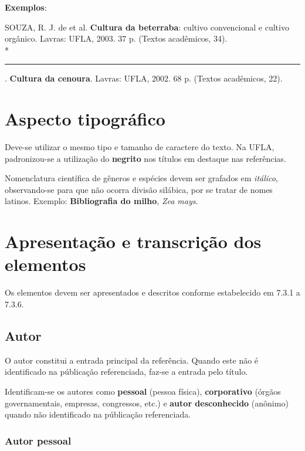 \begin{exemplomanual}
\textbf{Exemplos}:\\
\begin{singlespace}
SOUZA, R. J. de et al. \textbf{Cultura da beterraba}: cultivo convencional e cultivo orgânico. Lavras: UFLA, 2003. 37 p. (Textos acadêmicos, 34).\\*

\rule{1cm}{0.4pt}. \textbf{Cultura da cenoura}. Lavras: UFLA, 2002. 68 p. (Textos acadêmicos, 22).
\end{singlespace}
\end{exemplomanual}


\section{Aspecto tipográfico}

Deve-se utilizar o mesmo tipo e tamanho de caractere do texto. Na UFLA, padronizou-se a utilização do \textbf{negrito} nos títulos em destaque nas referências.

Nomenclatura científica de gêneros e espécies devem ser grafados em \textit{itálico}, observando-se para que não ocorra divisão silábica, por se tratar de nomes latinos.  Exemplo: \textbf{Bibliografia do milho}, \textit{Zea mays}.


\section{Apresentação e transcrição dos elementos}

Os elementos devem ser apresentados e descritos conforme estabelecido em 7.3.1 a 7.3.6.


\subsection{Autor}

O autor constitui a entrada principal da referência. Quando este não é identificado na públicação referenciada, faz-se a entrada pelo título.

Identificam-se os autores como \textbf{pessoal} (pessoa física), \textbf{corporativo} (órgãos governamentais, empresas, congressos, etc.) e \textbf{autor desconhecido} (anônimo) quando não identificado na públicação referenciada.


\subsubsection{Autor pessoal}

